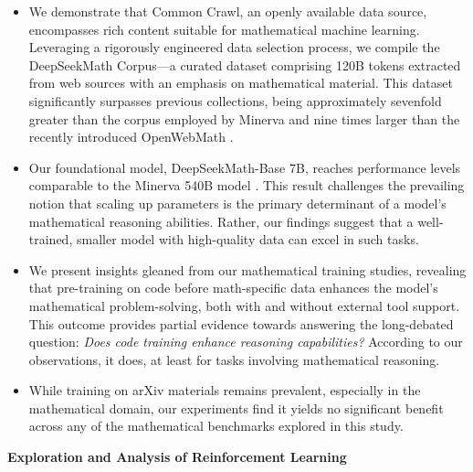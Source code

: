 \begin{itemize}[topsep=0pt]
    \item We demonstrate that Common Crawl, an openly available data source, encompasses rich content suitable for mathematical machine learning. Leveraging a rigorously engineered data selection process, we compile the DeepSeekMath Corpus—a curated dataset comprising 120B tokens extracted from web sources with an emphasis on mathematical material. This dataset significantly surpasses previous collections, being approximately sevenfold greater than the corpus employed by Minerva \citep{minerva} and nine times larger than the recently introduced OpenWebMath \citep{openwebmath}.

    \item Our foundational model, DeepSeekMath-Base 7B, reaches performance levels comparable to the Minerva 540B model \citep{minerva}. This result challenges the prevailing notion that scaling up parameters is the primary determinant of a model's mathematical reasoning abilities. Rather, our findings suggest that a well-trained, smaller model with high-quality data can excel in such tasks.

    \item We present insights gleaned from our mathematical training studies, revealing that pre-training on code before math-specific data enhances the model's mathematical problem-solving, both with and without external tool support. This outcome provides partial evidence towards answering the long-debated question: \textit{Does code training enhance reasoning capabilities?} According to our observations, it does, at least for tasks involving mathematical reasoning.

    \item While training on arXiv materials remains prevalent, especially in the mathematical domain, our experiments find it yields no significant benefit across any of the mathematical benchmarks explored in this study.
\end{itemize}

\textbf{Exploration and Analysis of Reinforcement Learning}

